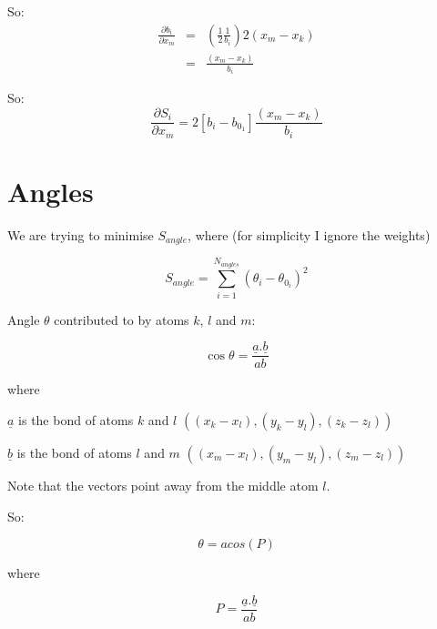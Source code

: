 \documentclass[a4paper,twocolumn,9pt]{article}
\begin{document}
So: 
\begin{eqnarray*}
\frac{\partial b_i}{\partial x_m} & = & (\frac{1}{2} \frac{1}{b_i}) 2 (x_m - x_k) \\
 &   = & \frac{(x_m - x_k)}{b_i}
\end{eqnarray*}

So: 
\begin{displaymath}
  \frac{\partial S_i}{\partial x_m} = 2[b_i - b_{0_1}] \frac{(x_m - x_k)}{b_i}
\end{displaymath}



\section{Angles}
We are trying to minimise $S_{angle}$, where (for simplicity I ignore
the weights)

\begin{displaymath}
  S_{angle} = \sum_{i=1}^{N_{angles}} {(\theta_i - \theta_{0_i})^2}
\end{displaymath}


Angle $\theta$ contributed to by atoms $k$, $l$ and $m$:

\begin{displaymath}
  \cos \theta = \frac{{\underline a}.{\underline b}}{ab}
\end{displaymath}

\begin{trivlist}
\item where
\item $\underline {a}$ is the bond of atoms $k$ and $l$ $((x_k-x_l), (y_k-y_l), (z_k-z_l))$
\item $\underline {b}$ is the bond of atoms $l$ and $m$  $((x_m-x_l), (y_m-y_l), (z_m-z_l))$
\item Note that the vectors point away from the middle atom $l$.
\end{trivlist}



So: 

\begin{equation}
  \label{eq:1}
  \theta = acos(P)
\end{equation}

where 

\begin{displaymath}
  P = \frac{{\underline a}.{\underline b}}{ab} 
\end{displaymath}
\end{document}
